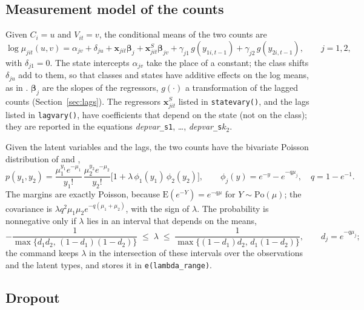 \documentclass[11pt,a4paper]{article}
\newcommand{\cmd}[1]{\texttt{#1}}
\newcommand{\xv}{\mathbf x}
\newcommand{\E}{\mathrm E}
\begin{document}
\subsection{Measurement model of the counts}

Given $C_i=u$ and $V_{it}=v$, the conditional means of the two counts are
\begin{equation}\label{eq:mean}
\log\mu_{jit}(u,v)=\alpha_{jv}+\delta_{ju}+\xv_{jit}\bm\beta_j+\xv^S_{jit}\bm\beta_{jv}
+\gamma_{j1}\,g(y_{1i,t-1})+\gamma_{j2}\,g(y_{2i,t-1}),\qquad j=1,2,
\end{equation}
with $\delta_{j1}=0$. The state intercepts $\alpha_{jv}$ take the place of a constant; the class shifts
$\delta_{ju}$ add to them, so that classes and states have additive effects on the log means, as in
\citet{carrieri2026}. $\bm\beta_j$ are the slopes of the regressors, $g(\cdot)$ a transformation of the
lagged counts (Section~\ref{sec:lags}). The regressors $\xv^S_{jit}$ listed in \cmd{statevary()}, and the
lags listed in \cmd{lagvary()}, have coefficients that depend on the state (not on the class); they
are reported in the equations \textit{depvar}\cmd{\_s1}, \dots, \textit{depvar}\cmd{\_s}$k_2$.

Given the latent variables and the lags, the two counts have the bivariate Poisson distribution of
\citet{lakshminarayana1999} and \citet{famoye2010},
\begin{equation}\label{eq:famoye}
p(y_1,y_2)=\frac{\mu_1^{y_1}e^{-\mu_1}}{y_1!}\,\frac{\mu_2^{y_2}e^{-\mu_2}}{y_2!}
\Big[1+\lambda\,\phi_1(y_1)\,\phi_2(y_2)\Big],
\qquad \phi_j(y)=e^{-y}-e^{-q\mu_j},\quad q=1-e^{-1}.
\end{equation}
The margins are exactly Poisson, because $\E(e^{-Y})=e^{-q\mu}$ for $Y\sim\mathrm{Po}(\mu)$; the
covariance is $\lambda q^2\mu_1\mu_2e^{-q(\mu_1+\mu_2)}$, with the sign of $\lambda$. The probability is
nonnegative only if $\lambda$ lies in an interval that depends on the means,
\begin{equation}\label{eq:range}
-\frac{1}{\max\{d_1d_2,\,(1-d_1)(1-d_2)\}}\;\le\;\lambda\;\le\;
\frac{1}{\max\{(1-d_1)d_2,\,d_1(1-d_2)\}},\qquad d_j=e^{-q\mu_j};
\end{equation}
the command keeps $\lambda$ in the intersection of these intervals over the observations and the latent
types, and stores it in \cmd{e(lambda\_range)}.

\subsection{Dropout}
\end{document}
